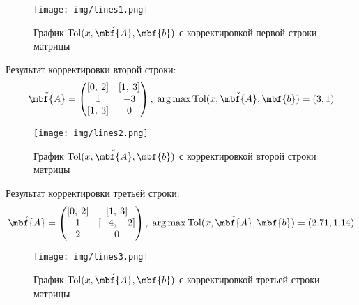 \documentclass[a4paper]{article}
\begin{document}
\begin{figure}[H]
    \centering
    \texttt{[image: img/lines1.png]}
    \caption{График $\mathrm{Tol}(x,\check{\mbf{A}},\mbf{b})$ с корректировкой первой строки матрицы}
    \label{fig:lines1}
\end{figure}
Результат корректировки второй строки:
\begin{equation*}
    \check{\mbf{A}}=\begin{pmatrix}
    [0,\:2]&[1,\:3]\\
    1&-3\\
    [1,\:3]&0
    \end{pmatrix},\;\mathrm{arg}\max\mathrm{Tol}(x,\check{\mbf{A}}, \mbf{b})=(3,1)
\end{equation*}
\begin{figure}[H]
    \centering
    \texttt{[image: img/lines2.png]}
    \caption{График $\mathrm{Tol}(x,\check{\mbf{A}},\mbf{b})$ с корректировкой второй строки матрицы}
    \label{fig:lines2}
\end{figure}
Результат корректировки третьей строки:
\begin{equation*}
    \check{\mbf{A}}=\begin{pmatrix}
    [0,\:2]&[1,\:3]\\
    1&[-4,\:-2]\\
    2&0
    \end{pmatrix},\;\mathrm{arg}\max\mathrm{Tol}(x,\check{\mbf{A}}, \mbf{b})=(2.71,1.14)
\end{equation*}
\begin{figure}[H]
    \centering
    \texttt{[image: img/lines3.png]}
    \caption{График $\mathrm{Tol}(x,\check{\mbf{A}},\mbf{b})$ с корректировкой третьей строки матрицы}
    \label{fig:lines3}
\end{figure}
\end{document}
